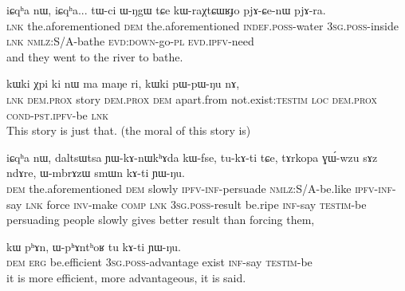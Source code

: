 \documentclass[oldfontcommands,oneside,a4paper,11pt]{article}
\newcommand{\ipab}[1]{{\phon#1}} %
\begin{document}
\begin{exe} 
 \ex 
\gll  \ipab{tɕe,} \ipab{iɕqʰa} \ipab{nɯ,} \ipab{iɕqʰa...} \ipab{tɯ-ci} \ipab{ɯ-ŋgɯ} \ipab{tɕe} \ipab{kɯ-raχtɕɯʁɟo} \ipab{pjɤ-ɕe-nɯ} \ipab{pjɤ-ra.} \\ 
 \textsc{lnk}  the.aforementioned \textsc{dem} the.aforementioned \textsc{indef}.\textsc{poss}-water 3\textsc{sg}.\textsc{poss}-inside \textsc{lnk} \textsc{nmlz}:S/A-bathe          \textsc{evd}:\textsc{down}-go-\textsc{pl}  \textsc{evd}.\textsc{ipfv}-need\\ 
 \glt  and they went to the river to bathe.
\end{exe} 

\begin{exe} 
 \ex 
\gll   \ipab{tɕendɤre} \ipab{kɯki} \ipab{χpi} \ipab{ki} \ipab{nɯ} \ipab{ma} \ipab{maŋe} \ipab{ri,} \ipab{kɯki} \ipab{pɯ-pɯ-ŋu} \ipab{nɤ,} \\ 
  \textsc{lnk}       \textsc{dem}.\textsc{prox} story \textsc{dem}.\textsc{prox} \textsc{dem} apart.from not.exist:\textsc{testim} \textsc{loc} \textsc{dem}.\textsc{prox} \textsc{cond}-\textsc{pst}.\textsc{ipfv}-be  \textsc{lnk} \\ 
 \glt  This story is just that. (the moral of this story is)
\end{exe} 

\begin{exe} 
 \ex 
\gll   \ipab{nɤkinɯ,} \ipab{iɕqʰa} \ipab{nɯ,} \ipab{daltsɯtsa} \ipab{ɲɯ-kɤ-nɯkʰɤda} \ipab{kɯ-fse,} \ipab{tu-kɤ-ti}  \ipab{tɕe,} \ipab{tɤrkopa} \ipab{ɣɯ́-wzu} \ipab{sɤz} \ipab{ndɤre,} \ipab{ɯ-mbrɤzɯ} \ipab{smɯn} \ipab{kɤ-ti} \ipab{ɲɯ-ŋu.}   \\ 
 \textsc{dem}      the.aforementioned \textsc{dem} slowly     \textsc{ipfv}-\textsc{inf}-persuade   \textsc{nmlz}:S/A-be.like \textsc{ipfv}-\textsc{inf}-say \textsc{lnk}  force    \textsc{inv}-make \textsc{comp} \textsc{lnk}    3\textsc{sg}.\textsc{poss}-result   be.ripe \textsc{inf}-say \textsc{testim}-be   \\ 
 \glt  persuading people slowly gives better result than forcing them,  
\end{exe} 
 

\begin{exe} 
 \ex 
\gll   \ipab{nɯ} \ipab{kɯ} \ipab{pʰɤn,} \ipab{ɯ-pʰɤntʰoʁ} \ipab{tu} \ipab{kɤ-ti} \ipab{ɲɯ-ŋu.} \\ 
 \textsc{dem} \textsc{erg} be.efficient 3\textsc{sg}.\textsc{poss}-advantage    exist \textsc{inf}-say \textsc{testim}-be\\ 
 \glt  it is more efficient, more advantageous, it is said.
\end{exe} 





\end{document}
